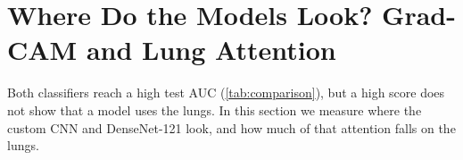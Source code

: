 \section{Where Do the Models Look? Grad-CAM and Lung Attention}
\label{sec:gradcam}

Both classifiers reach a high test AUC (\cref{tab:comparison}), but a high score does not show that a model uses the lungs.
In this section we measure where the custom CNN and DenseNet-121 look, and how much of that attention falls on the lungs.

